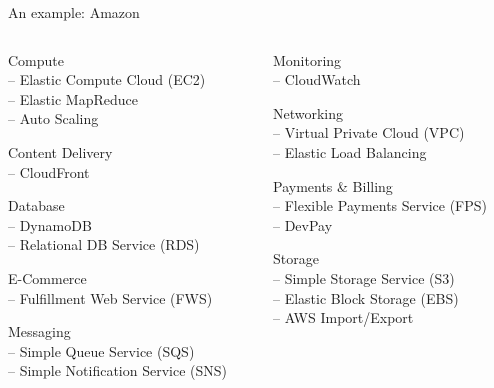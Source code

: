 \begin{frame}{An example: Amazon}

{\footnotesize 
\begin{columns}
\begin{column}{0.50\textwidth}
\BI
\item Compute\\
-- Elastic Compute Cloud (EC2)\\
-- Elastic MapReduce\\
-- Auto Scaling

\item Content Delivery\\
-- CloudFront\\

\item Database\\
-- DynamoDB\\
-- Relational DB Service (RDS)

\item E-Commerce\\
-- Fulfillment Web Service (FWS)

\item Messaging\\
-- Simple Queue Service (SQS)\\
-- Simple Notification Service (SNS)
\EI
\end{column}
\begin{column}{0.50\textwidth}
\BI
\item Monitoring \\
-- CloudWatch

\item Networking\\
-- Virtual Private Cloud (VPC)\\
-- Elastic Load Balancing

\item Payments \& Billing \\
-- Flexible Payments Service (FPS) \\
-- DevPay

\item Storage\\
-- Simple Storage Service (S3) \\
-- Elastic Block Storage (EBS) \\
-- AWS Import/Export

\EI

\end{column}
\end{columns}
}

\end{frame}

